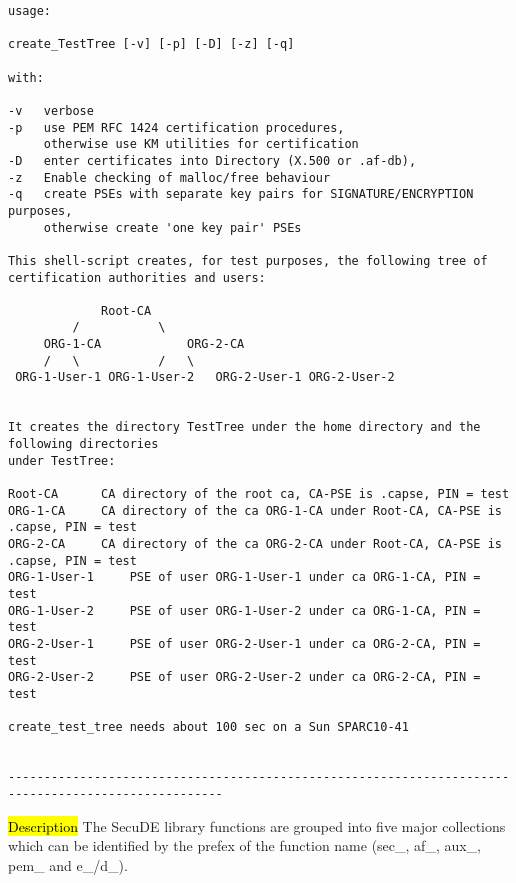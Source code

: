 {\begin{verbatim}
usage: 
 
create_TestTree [-v] [-p] [-D] [-z] [-q] 
 
with: 
 
-v 	 verbose 
-p 	 use PEM RFC 1424 certification procedures, 
 	 otherwise use KM utilities for certification 
-D 	 enter certificates into Directory (X.500 or .af-db), 
-z 	 Enable checking of malloc/free behaviour 
-q 	 create PSEs with separate key pairs for SIGNATURE/ENCRYPTION purposes, 
 	 otherwise create 'one key pair' PSEs
 
This shell-script creates, for test purposes, the following tree of 
certification authorities and users: 
 
 			 Root-CA 
 		 / 			 \ 
 	 ORG-1-CA 			 ORG-2-CA 
 	 / 	 \ 			 / 	 \ 
 ORG-1-User-1 ORG-1-User-2 	 ORG-2-User-1 ORG-2-User-2 
 
 
It creates the directory TestTree under the home directory and the following directories 
under TestTree: 
 
Root-CA 	 CA directory of the root ca, CA-PSE is .capse, PIN = test 
ORG-1-CA 	 CA directory of the ca ORG-1-CA under Root-CA, CA-PSE is .capse, PIN = test 
ORG-2-CA 	 CA directory of the ca ORG-2-CA under Root-CA, CA-PSE is .capse, PIN = test 
ORG-1-User-1 	 PSE of user ORG-1-User-1 under ca ORG-1-CA, PIN = test 
ORG-1-User-2 	 PSE of user ORG-1-User-2 under ca ORG-1-CA, PIN = test 
ORG-2-User-1 	 PSE of user ORG-2-User-1 under ca ORG-2-CA, PIN = test 
ORG-2-User-2 	 PSE of user ORG-2-User-2 under ca ORG-2-CA, PIN = test
 
create_test_tree needs about 100 sec on a Sun SPARC10-41


----------------------------------------------------------------------------------------------------
\end{verbatim}
}

\label{intro3}
\hl{Description}
The SecuDE library functions are grouped into five major collections which 
can be identified by the prefex of the function name (sec\_, af\_,
aux\_, pem\_ and e\_/d\_).

